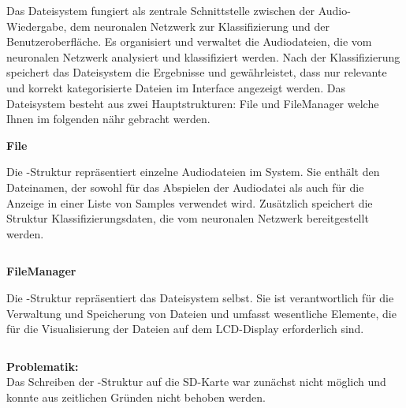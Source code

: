 Das Dateisystem fungiert als zentrale Schnittstelle zwischen der Audio-Wiedergabe, dem neuronalen Netzwerk zur Klassifizierung und der Benutzeroberfläche. Es organisiert und verwaltet die Audiodateien, die vom neuronalen Netzwerk analysiert und klassifiziert werden. Nach der Klassifizierung speichert das Dateisystem die Ergebnisse und gewährleistet, dass nur relevante und korrekt kategorisierte Dateien im Interface angezeigt werden. Das Dateisystem besteht aus zwei Hauptstrukturen: File und FileManager welche Ihnen im folgenden nähr gebracht werden.

\vspace{1em}
\textbf{File}
\vspace{1em}

Die -Struktur repräsentiert einzelne Audiodateien im System. Sie enthält den Dateinamen, der sowohl für das Abspielen der Audiodatei als auch für die Anzeige in einer Liste von Samples verwendet wird. Zusätzlich speichert die Struktur Klassifizierungsdaten, die vom neuronalen Netzwerk bereitgestellt werden.


 \inputminted[firstline=37, lastline=41]{c}{../../f401_display_encoder_fader_test/Core/Inc/filemanager.h}
 
\vspace{1em}
\textbf{FileManager}
\vspace{1em}

Die -Struktur repräsentiert das Dateisystem selbst. Sie ist verantwortlich für die Verwaltung und Speicherung von Dateien und umfasst wesentliche Elemente, die für die Visualisierung der Dateien auf dem LCD-Display erforderlich sind.
 
 \inputminted[firstline=49, lastline=58]{c}{../../f401_display_encoder_fader_test/Core/Inc/filemanager.h}
 
\vspace{1em} 
\textbf{Problematik:} \\



Das Schreiben der -Struktur auf die SD-Karte war zunächst nicht möglich und konnte aus zeitlichen Gründen nicht behoben werden.



